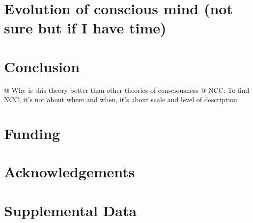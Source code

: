 \documentclass[utf8]{article}
\newenvironment{ants}
			{
			 \begin{easylist}[itemize]
			}
			{
			\end{easylist}
			}
\begin{document}
	\section{Evolution of conscious mind (not sure but if I have time)}
		\cite{dennett2008kinds}
		

	\section{Conclusion}
		\begin{ants}
			@ Why is this theory better than other theories of consciousness
			@ NCC: To find NCC, it's not about where and when, it's about scale and level of description			 
		\end{ants}

	
	
	
	\section*{Funding}
	
	\section*{Acknowledgements}
	
	\section*{Supplemental Data}
	
	
	
	
	
	
\end{document}
